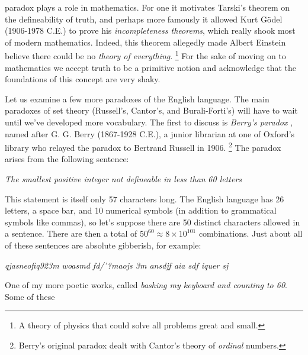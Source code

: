         paradox plays a role in mathematics. For one it motivates Tarski's
        theorem on the defineability of truth, and perhaps more famously it
        allowed Kurt G\"{o}del
        (1906-1978 C.E.) to prove his
        \textit{incompleteness theorems}, which really shook most of modern
        mathematics. Indeed, this theorem allegedly made Albert
        Einstein believe there could be no
        \textit{theory of everything}.%
        \footnote{%
            A theory of physics that could solve all problems great and small.%
         } 
        For the sake of moving on to mathematics we accept truth to be a
        primitive notion and acknowledge that the foundations of this concept
        are very shaky.
        \par\hfill\par
        Let us examine a few more paradoxes of the English language. The main
        paradoxes of set theory (Russell's, Cantor's, and Burali-Forti's) will
        have to wait until we've developed more vocabulary. The first to discuss
        is \textit{Berry's paradox}%
        , named after G. G. Berry
        (1867-1928 C.E.), a junior librarian at one of Oxford's library who
        relayed the paradox to Bertrand Russell in 1906.%
        \footnote{%
            Berry's original paradox dealt with Cantor's theory of
            \textit{ordinal} numbers.
        }
        The paradox arises from the following sentence:
        \begin{center}
            \textit{The smallest positive integer not defineable in less than}
            \textit{60 letters}
        \end{center}
        This statement is itself only 57 characters long. The English language
        has 26 letters, a space bar, and 10 numerical symbols (in addition to
        grammatical symbols like commas), so let's suppose there are 50 distinct
        characters allowed in a sentence. There are then a total of
        $50^{60}\approx{8}\times{10}^{101}$ combinations. Just about all of
        these sentences are absolute gibberish, for example:
        \begin{center}
            \textit{qjasneofiq923m woasmd fd/'?maojs 3m ansdjf aia sdf iquer sj}
        \end{center}
        One of my more poetic works, called
        \textit{bashing my keyboard and counting to 60}. Some of these
